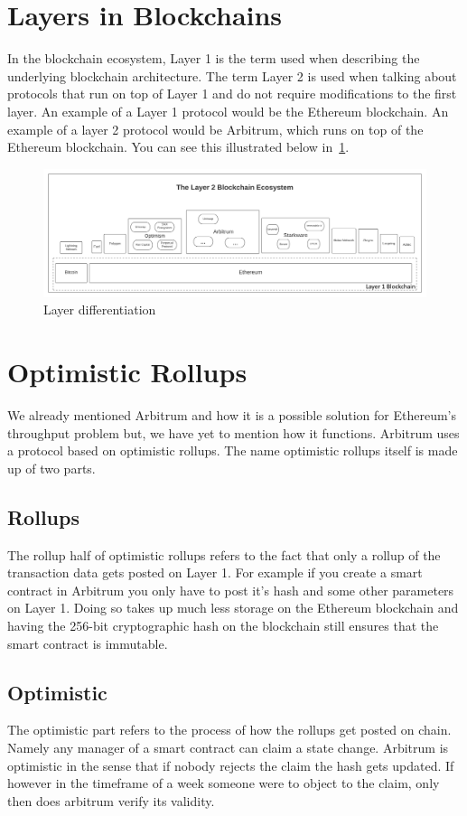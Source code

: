 \documentclass[a4paper,oneside,openright,11pt]{report}
\begin{document}
\section{Layers in Blockchains}
In the blockchain ecosystem, Layer 1 is the term used when describing the underlying blockchain architecture.
The term Layer 2 is used when talking about protocols that run on top of Layer 1 and do not require
modifications to the first layer. An example of a Layer 1 protocol would be the Ethereum blockchain. 
An example of a layer 2 protocol would be Arbitrum, which runs on top of the Ethereum blockchain. 
You can see this illustrated below in~\cref{fig:Layer1_Layer2_comparison}.

\begin{figure}
	\centering
	\includegraphics[scale=0.8]{./Pictures/Layer-2-Ecosystem-Map.png}
	\caption{Layer differentiation}
	\label{fig:Layer1_Layer2_comparison}
\end{figure}

\section{Optimistic Rollups}
We already mentioned Arbitrum and how it is a possible solution for Ethereum's throughput problem
but, we have yet to mention how it functions. Arbitrum uses a protocol based on optimistic rollups.
The name optimistic rollups itself is made up of two parts.
\subsection{Rollups}
The rollup half of optimistic rollups refers to the fact that only a rollup of the transaction data
gets posted on Layer 1. For example if you create a smart contract in Arbitrum you only have 
to post it's hash and some other parameters on Layer 1. Doing so takes up much less storage 
on the Ethereum blockchain and having the 256-bit cryptographic hash on the blockchain still 
ensures that the smart contract is immutable.

\subsection{Optimistic}
The optimistic part refers to the process of how the rollups get posted on chain. 
Namely any manager of a smart contract can claim a state change. Arbitrum is optimistic in
the sense that if nobody rejects the claim the hash gets updated. If however in the timeframe
of a week someone were to object to the claim, only then does arbitrum verify its validity.
\end{document}
